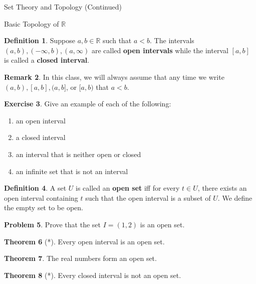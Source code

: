 \documentclass[11pt]{article}
\theoremstyle{definition}
\newtheorem{theorem}{Theorem}[section]
\newtheorem{definition}[theorem]{Definition}
\newtheorem{exercise}[theorem]{Exercise}
\newtheorem{problem}[theorem]{Problem}
\newtheorem{proposition}[theorem]{Proposition}
\newtheorem{remark}[theorem]{Remark}
\begin{document}
\begin{section}{Set Theory and Topology (Continued)}
\begin{subsection}{Basic Topology of $\mathbb{R}$}
\begin{definition}
Suppose $a,b\in\mathbb{R}$ such that $a<b$.  The intervals $(a,b), (-\infty,b), (a,\infty)$ are called \textbf{open intervals} while the interval $[a,b]$ is called a \textbf{closed interval}.
\end{definition}

\begin{remark} 
In this class, we will always assume that any time we write $(a,b), [a,b], (a,b]$, or $[a,b)$ that $a<b$. 
\end{remark}

\begin{exercise} Give an example of each of the following:
\begin{enumerate}
\item an open interval
\item a closed interval
\item an interval that is neither open or closed
\item an infinite set that is not an interval
\end{enumerate}
\end{exercise}

\begin{definition}
A set $U$ is called an \textbf{open set} iff for every $t \in U$, there exists an open interval containing $t$ such that the open interval is a subset of $U$.  We define the empty set to be open.\end{definition}


\begin{problem} 
Prove that the set $I=(1,2)$ is an open set.
\end{problem}

\begin{theorem}[*]
Every open interval is an open set. 
\end{theorem}

\begin{theorem}
The real numbers form an open set.
\end{theorem}

\begin{theorem}[*]
Every closed interval is not an open set.
\end{theorem}


\end{subsection}
\end{section}
\end{document}
